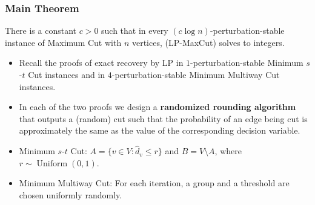 \documentclass{beamer}
\DeclareMathOperator{\Uniform}{Uniform}
\begin{document}
    \begin{frame}
        \frametitle{Main Theorem}

        \begin{theorem}
            There is a constant $c > 0$ such that in every $(c \log n)$-perturbation-stable instance of {\sc Maximum Cut} with $n$ vertices, {\sc (LP-MaxCut)} solves to integers.
        \end{theorem}

        \pause

        \begin{itemize}
            \item Recall the proofs of exact recovery by LP in $1$-perturbation-stable {\sc Minimum $s$-$t$ Cut} instances and in $4$-perturbation-stable {\sc Minimum Multiway Cut} instances. \pause
            \item In each of the two proofs we design a {\bf randomized rounding algorithm} that outputs a (random) cut such that the probability of an edge being cut is approximately the same as the value of the corresponding decision variable. \pause
            \item {\sc Minimum $s$-$t$ Cut}: $A = \{ v \in V : \hat d_v \leq r \}$ and $B = V \setminus A$, where $r \sim \Uniform(0, 1)$. \pause
            \item {\sc Minimum Multiway Cut}: For each iteration, a group and a threshold are chosen uniformly randomly.
        \end{itemize}
    \end{frame}
\end{document}
